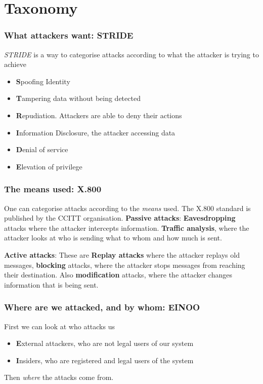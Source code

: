 \section{Taxonomy}
    \begin{frame}
        \frametitle{What attackers want: STRIDE}
            \textit{STRIDE} is a way to categorise attacks according to what the attacker is trying to achieve
            \begin{itemize}
                \item \textbf{S}poofing Identity
                \item \textbf{T}ampering data without being detected
                \item \textbf{R}epudiation. Attackers are able to deny their actions
                \item \textbf{I}nformation Disclosure, the attacker accessing data
                \item \textbf{D}enial of service
                \item \textbf{E}levation of privilege
            \end{itemize}
    \end{frame}
    \begin{frame}
        \frametitle{The means used: X.800}
            One can categorise attacks according to the \textit{means} used. The X.800 standard is published by the CCITT organisation.
            \textbf{Passive attacks}: \textbf{Eavesdropping} attacks where the attacker intercepts information. \textbf{Traffic analysis}, where the attacker looks at who is sending what to whom and how much is sent.
            
            \textbf{Active attacks}: These are \textbf{Replay attacks} where the attacker replays old messages, \textbf{blocking} attacks, where the attacker stops messages from reaching their destination. Also \textbf{modification} attacks, where the attacker changes information that is being sent. 
    \end{frame}
    \begin{frame}
        \frametitle{Where are we attacked, and by whom: EINOO}
            First we can look at who attacks us
            \begin{itemize}
                \item \textbf{E}xternal attackers, who are not legal users of our system
                \item \textbf{I}nsiders, who are registered and legal users of the system
            \end{itemize}
            Then \textit{where} the attacks come from. 
    \end{frame}
